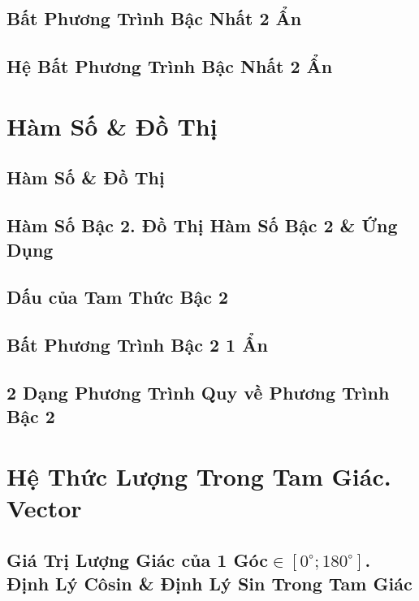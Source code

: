 \documentclass[oneside]{book}
\numberwithin{equation}{section}
\begin{document}
\section{Bất Phương Trình Bậc Nhất 2 Ẩn}

\section{Hệ Bất Phương Trình Bậc Nhất 2 Ẩn}


\chapter{Hàm Số \& Đồ Thị}

\section{Hàm Số \& Đồ Thị}

\section{Hàm Số Bậc 2. Đồ Thị Hàm Số Bậc 2 \& Ứng Dụng}

\section{Dấu của Tam Thức Bậc 2}

\section{Bất Phương Trình Bậc 2 1 Ẩn}

\section{2 Dạng Phương Trình Quy về Phương Trình Bậc 2}


\chapter{Hệ Thức Lượng Trong Tam Giác. Vector}

\section{Giá Trị Lượng Giác của 1 Góc$\in[0^\circ;180^\circ]$. Định Lý Côsin \& Định Lý Sin Trong Tam Giác}
\end{document}
